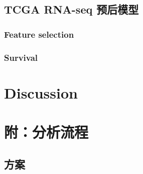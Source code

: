 \documentclass[
]{article}
\begin{document}
\hypertarget{tcga-rna-seq-ux9884ux540eux6a21ux578b}{%
\subsection{TCGA RNA-seq 预后模型}\label{tcga-rna-seq-ux9884ux540eux6a21ux578b}}

\hypertarget{feature-selection}{%
\subsubsection{Feature selection}\label{feature-selection}}

\hypertarget{survival}{%
\subsubsection{Survival}\label{survival}}

\hypertarget{discussion}{%
\section{Discussion}\label{discussion}}

\hypertarget{ux9644ux5206ux6790ux6d41ux7a0b}{%
\section{附：分析流程}\label{ux9644ux5206ux6790ux6d41ux7a0b}}

\hypertarget{ux65b9ux6848}{%
\subsection{方案}\label{ux65b9ux6848}}
\end{document}
